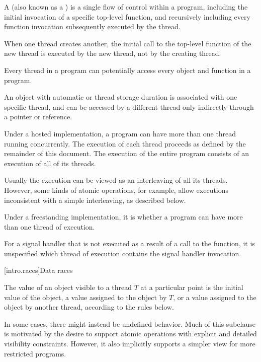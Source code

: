 \pnum
{}%
%
A  (also known as a ) is a single flow of
control within a program, including the initial invocation of a specific
top-level function, and recursively including every function invocation
subsequently executed by the thread.
\begin{note}
When one thread creates another,
the initial call to the top-level function of the new thread is executed by the
new thread, not by the creating thread.
\end{note}
Every thread in a program can
potentially access every object and function in a program.
\begin{footnote}
An object
with automatic or thread storage duration is associated with
one specific thread, and can be accessed by a different thread only indirectly
through a pointer or reference.
\end{footnote}
Under a hosted
implementation, a \Cpp{} program can have more than one thread running
concurrently. The execution of each thread proceeds as defined by the remainder
of this document. The execution of the entire program consists of an execution
of all of its threads.
\begin{note}
Usually the execution can be viewed as an
interleaving of all its threads. However, some kinds of atomic operations, for
example, allow executions inconsistent with a simple interleaving, as described
below.
\end{note}
%
Under a freestanding implementation, it is  whether a program can
have more than one thread of execution.

\pnum
For a signal handler that is not executed as a result of a call to the
 function, it is unspecified which thread of execution
contains the signal handler invocation.

[intro.races]{Data races}

\pnum
The value of an object visible to a thread $T$ at a particular point is the
initial value of the object, a value assigned to the object by $T$, or a
value assigned to the object by another thread, according to the rules below.
\begin{note}
In some cases, there might instead be undefined behavior. Much of this
subclause is motivated by the desire to support atomic operations with explicit
and detailed visibility constraints. However, it also implicitly supports a
simpler view for more restricted programs.
\end{note}

